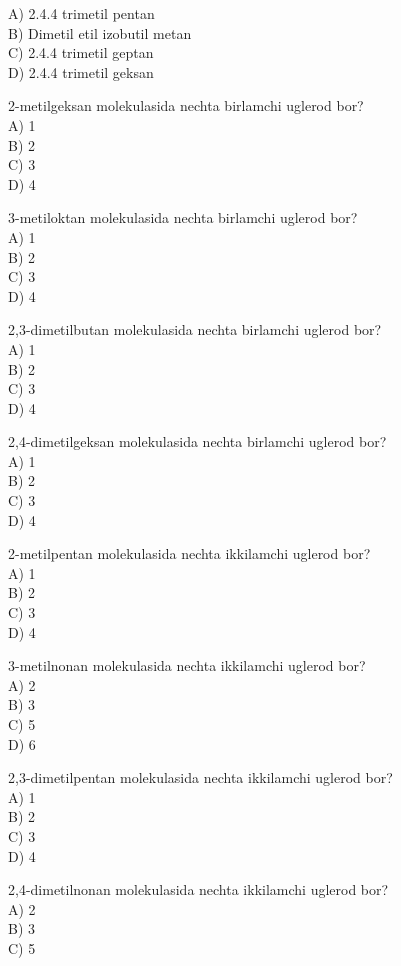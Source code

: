 A) 2.4.4 trimetil pentan\\
B) Dimetil etil izobutil metan\\
C) 2.4.4 trimetil geptan\\
D) 2.4.4 trimetil geksan
  \item 2-metilgeksan molekulasida nechta birlamchi uglerod bor?\\
A) 1\\
B) 2\\
C) 3\\
D) 4\\
  \item 3-metiloktan molekulasida nechta birlamchi uglerod bor?\\
A) 1\\
B) 2\\
C) 3\\
D) 4
  \item 2,3-dimetilbutan molekulasida nechta birlamchi uglerod bor?\\
A) 1\\
B) 2\\
C) 3\\
D) 4
  \item 2,4-dimetilgeksan molekulasida nechta birlamchi uglerod bor?\\
A) 1\\
B) 2\\
C) 3\\
D) 4
  \item 2-metilpentan molekulasida nechta ikkilamchi uglerod bor?\\
A) 1\\
B) 2\\
C) 3\\
D) 4
  \item 3-metilnonan molekulasida nechta ikkilamchi uglerod bor?\\
A) 2\\
B) 3\\
C) 5\\
D) 6
  \item 2,3-dimetilpentan molekulasida nechta ikkilamchi uglerod bor?\\
A) 1\\
B) 2\\
C) 3\\
D) 4
  \item 2,4-dimetilnonan molekulasida nechta ikkilamchi uglerod bor?\\
A) 2\\
B) 3\\
C) 5\\
